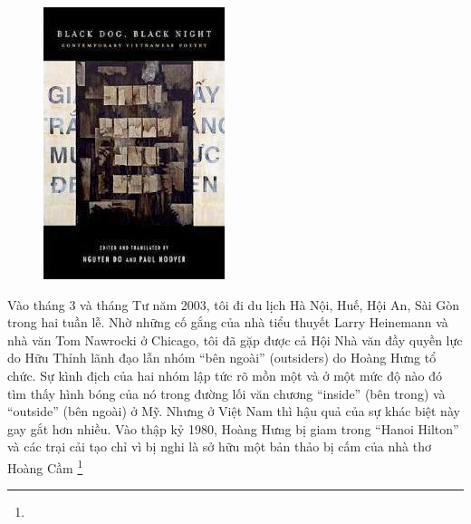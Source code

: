 \documentclass[../main.tex]{subfiles}
\begin{document}
\begin{multicols}{2}

\begin{figure}
	\centering
	\includegraphics[width=\textwidth]{../img/tho270808.jpg}
	\caption{}
\end{figure}
  Vào tháng 3 và tháng Tư năm 2003, tôi đi du lịch Hà Nội, Huế, Hội An, Sài Gòn trong hai tuần lễ. Nhờ những cố gắng của nhà tiểu thuyết Larry Heinemann và nhà văn Tom Nawrocki ở Chicago, tôi đã gặp được cả Hội Nhà văn đầy quyền lực do Hữu Thỉnh lãnh đạo lẫn nhóm “bên ngoài” (outsiders) do Hoàng Hưng tổ chức. Sự kình địch của hai nhóm lập tức rõ mồn một và ở một mức độ nào đó tìm thấy hình bóng của nó trong đường lối văn chương “inside” (bên trong) và “outside” (bên ngoài) ở Mỹ. Nhưng ở Việt Nam thì hậu quả của sự khác biệt này gay gắt hơn nhiều. Vào thập kỷ 1980, Hoàng Hưng bị giam trong “Hanoi Hilton” và các trại cải tạo chỉ vì bị nghi là sở hữu một bản thảo bị cấm của nhà thơ Hoàng Cầm \footnote{
}
\end{multicols}
\end{document}
